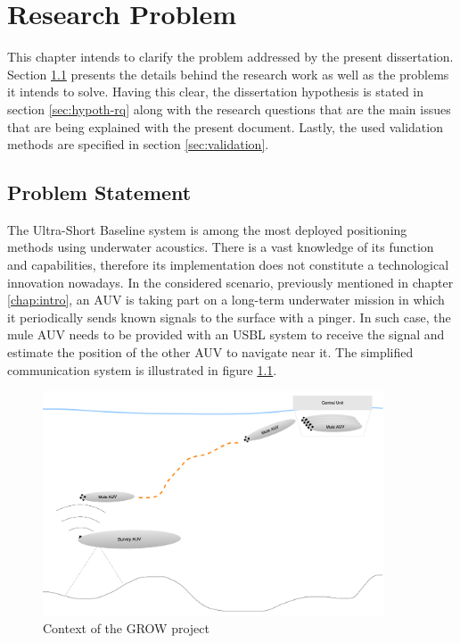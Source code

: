 \chapter{Research Problem} \label{chap:problem}

This chapter intends to clarify the problem addressed by the present dissertation. Section \ref{sec:prob-state} presents the details behind the research work as well as the problems it intends to solve. Having this clear, the dissertation hypothesis is stated in section \ref{sec:hypoth-rq} along with the research questions that are the main issues that are being explained with the present document. Lastly, the used validation methods are specified in section \ref{sec:validation}.

\section{Problem Statement} \label{sec:prob-state}

The Ultra-Short Baseline system is among the most deployed positioning methods using underwater acoustics. There is a vast knowledge of its function and capabilities, therefore its implementation does not constitute a technological innovation nowadays. 
In the considered scenario, previously mentioned in chapter \ref{chap:intro}, an AUV is taking part on a long-term underwater mission in which it periodically sends known signals to the surface with a pinger. In such case, the mule AUV needs to be provided with an USBL system to receive the signal and estimate the position of the other AUV to navigate near it. The simplified communication system is illustrated in figure \ref{fig:grow}. 

\begin{figure}[!htbp]
	\centering
	\includegraphics[width=0.9\textwidth]{figures/GROW}
	\caption{Context of the GROW project}
	\label{fig:grow}
\end{figure}

